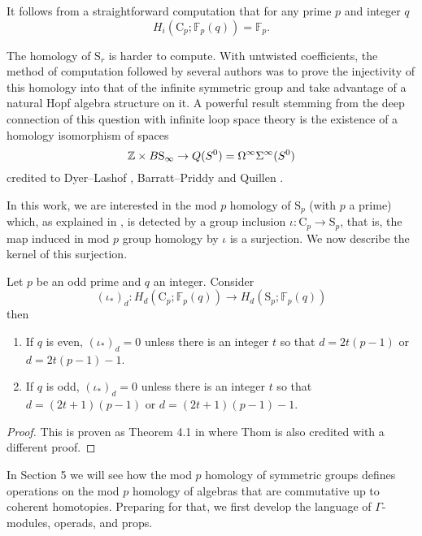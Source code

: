 It follows from a straightforward computation that for any prime $p$ and integer $q$
\begin{equation*}
H_i(\mathrm{C}_p; \mathbb{F}_p(q)) = \mathbb{F}_p.
\end{equation*}

The homology of $\mathrm{S}_r$ is harder to compute.
With untwisted coefficients, the method of computation followed by several authors was to prove the injectivity of this homology into that of the infinite symmetric group and take advantage of a natural Hopf algebra structure on it.
A powerful result stemming from the deep connection of this question with infinite loop space theory is the existence of a homology isomorphism of spaces
\begin{equation*}
\mathbb{Z} \times B\mathrm{S}_\infty \to Q(S^0) = \Omega^\infty \Sigma^\infty (S^0)
\end{equation*}
credited to Dyer--Lashof \cite{dyer62lashof}, Barratt--Priddy and Quillen \cite{barratt1972priddyquillen}.

In this work, we are interested in the mod $p$ homology of $\mathrm{S}_p$ (with $p$ a prime) which, as explained in \cite[Corollary~VI.1.4]{adem2004milgram}, is detected by a group inclusion $\iota \colon \mathrm{C}_p \to \mathrm{S}_p$, that is, the map induced in mod $p$ group homology by $\iota$ is a surjection.
We now describe the kernel of this surjection.

\begin{lemma} \label{lem: Thom's theorem}
	Let $p$ be an odd prime and $q$ an integer.
	Consider
	\begin{equation*}
	(\iota_\ast)_d \colon H_d(\mathrm{C}_p; \mathbb{F}_p(q)) \to H_d(\mathrm{S}_p; \mathbb{F}_p(q))
	\end{equation*}
	then
	\begin{enumerate}
		\item If $q$ is even, $(\iota_\ast)_d = 0$ unless there is an integer $t$ so that $d = 2t(p-1)$ or $d = 2t(p-1) - 1$.
		\item If $q$ is odd, $(\iota_\ast)_d = 0$ unless there is an integer $t$ so that $d = (2t+1)(p-1)$ or $d = (2t+1)(p-1)-1$.
	\end{enumerate}
\end{lemma}

\begin{proof}
	This is proven as Theorem 4.1 in \cite{steenrod1953cyclic} where Thom is also credited with a different proof.
\end{proof}

In Section 5 we will see how the mod $p$ homology of symmetric groups defines operations on the mod $p$ homology of algebras that are commutative up to coherent homotopies.
Preparing for that, we first develop the language of $\Gamma$-modules, operads, and props.